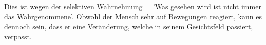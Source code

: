 Dies ist wegen der selektiven Wahrnehmung = 'Was gesehen wird ist nicht immer das Wahrgenommene'.
Obwohl der Mensch sehr auf Bewegungen reagiert, kann es dennoch sein, dass er eine Veränderung,
welche in seinem Gesichtsfeld passiert, verpasst.
